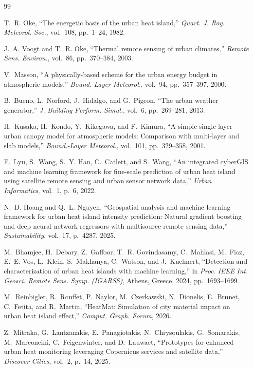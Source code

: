 \documentclass[journal]{IEEEtran}
\begin{document}
\begin{thebibliography}{99}

T.~R. Oke, ``The energetic basis of the urban heat island,'' \emph{Quart.
J. Roy. Meteorol. Soc.}, vol.~108, pp.~1--24, 1982.

J.~A. Voogt and T.~R. Oke, ``Thermal remote sensing of urban climates,''
\emph{Remote Sens. Environ.}, vol.~86, pp.~370--384, 2003.

V.~Masson, ``A physically-based scheme for the urban energy budget in
atmospheric models,'' \emph{Bound.-Layer Meteorol.}, vol.~94,
pp.~357--397, 2000.

B.~Bueno, L.~Norford, J.~Hidalgo, and G.~Pigeon, ``The urban weather
generator,'' \emph{J. Building Perform. Simul.}, vol.~6, pp.~269--281,
2013.

H.~Kusaka, H.~Kondo, Y.~Kikegawa, and F.~Kimura, ``A simple single-layer
urban canopy model for atmospheric models: Comparison with multi-layer and
slab models,'' \emph{Bound.-Layer Meteorol.}, vol.~101, pp.~329--358, 2001.

F.~Lyu, S.~Wang, S.~Y. Han, C.~Catlett, and S.~Wang, ``An integrated
cyberGIS and machine learning framework for fine-scale prediction of urban
heat island using satellite remote sensing and urban sensor network
data,'' \emph{Urban Informatics}, vol.~1, p.~6, 2022.

N.~D. Hoang and Q.~L. Nguyen, ``Geospatial analysis and machine learning
framework for urban heat island intensity prediction: Natural gradient
boosting and deep neural network regressors with multisource remote
sensing data,'' \emph{Sustainability}, vol.~17, p.~4287, 2025.

M.~Bhamjee, H.~Debary, Z.~Gaffoor, T.~R. Govindasamy, C.~Mahlasi,
M.~Fiaz, E.~E. Vos, L.~Klein, S.~Makhanya, C.~Watson, and J.~Kuehnert,
``Detection and characterization of urban heat islands with machine
learning,'' in \emph{Proc. IEEE Int. Geosci. Remote Sens. Symp. (IGARSS)},
Athens, Greece, 2024, pp.~1693--1699.

M.~Reinbigler, R.~Rouffet, P.~Naylor, M.~Czerkawski, N.~Dionelis,
E.~Brunet, C.~Fetita, and R.~Martin, ``HeatMat: Simulation of city
material impact on urban heat island effect,'' \emph{Comput. Graph.
Forum}, 2026.

Z.~Mitraka, G.~Lantzanakis, E.~Panagiotakis, N.~Chrysoulakis,
G.~Somarakis, M.~Marconcini, C.~Feigenwinter, and D.~Lauwaet,
``Prototypes for enhanced urban heat monitoring leveraging Copernicus
services and satellite data,'' \emph{Discover Cities}, vol.~2, p.~14,
2025.


\end{thebibliography}
\end{document}
